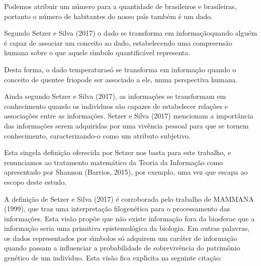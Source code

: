 \documentclass[
12pt,		%
openright,	%
twoside,  %
a4paper,			%
chapter=TITLE,		%
english,			%
french,				%
spanish,			%
brazil				%
]{USPSC-classe/USPSC_RedarTex}
\begin{document}
Podemos atribuir um n\'umero para a quantidade de brasileiros e brasileiras, portanto o n\'umero de habitantes do nosso pa\'{\i}s tamb\'em \'e um dado.










Segundo Setzer e Silva (2017) o dado se transforma em \textquotedbl informa\c{c}\~ao\textquotedbl  quando algu\'em \'e capaz de associar um conceito ao dado, estabelecendo uma compreens\~ao humana sobre o que aquele s\'{\i}mbolo quantific\'avel representa.










Desta forma, o dado \textquotedbl temperatura\textquotedbl  s\'o se transforma em informa\c{c}\~ao quando o conceito de \textquotedbl quente\textquotedbl  e \textquotedbl frio\textquotedbl  pode ser associado a ele, numa perspectiva humana.










Ainda segundo Setzer e Silva (2017), as informa\c{c}\~oes se transformam em conhecimento quando os indiv\'{\i}duos s\~ao capazes de estabelecer rela\c{c}\~oes e associa\c{c}\~oes entre as informa\c{c}\~oes.  Setzer e Silva (2017) mencionam a import\^ancia das informa\c{c}\~oes serem adquiridas por uma viv\^encia pessoal para que se tornem conhecimento, caracterizando-o como um atributo subjetivo.










Esta singela defini\c{c}\~ao oferecida por Setzer nos basta para este trabalho, e renunciamos ao tratamento matem\'atico da Teoria da Informa\c{c}\~ao como apresentado por Shannon (Barrios, 2015), por exemplo, uma vez que escapa ao escopo deste estudo.










A defini\c{c}\~ao de Setzer e Silva (2017) \'e corroborada pelo trabalho de MAMMANA (1999), que traz uma interpreta\c{c}\~ao filogen\'etica para o processamento das informa\c{c}\~oes. Esta vis\~ao prop\~oe que \textquotedbl n\~ao existe informa\c{c}\~ao fora da biosfera\textquotedbl  e que a informa\c{c}\~ao seria uma primitiva epistemol\'ogica da biologia. Em outras palavras, os dados representados por s\'{\i}mbolos s\'o adquirem um car\'ater de informa\c{c}\~ao quando passam a influenciar a probabilidade de sobreviv\^encia do patrim\^onio gen\'etico de um indiv\'{\i}duo. Esta vis\~ao fica expl\'{\i}cita na seguinte cita\c{c}\~ao:
\end{document}
